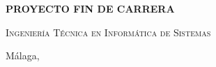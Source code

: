 \begin{titlepage}
  \bigskip
  
  \begin{center}\Large\textbf{\textsf{PROYECTO FIN DE CARRERA}}\end{center}
  
  \medskip
  
  \begin{center}
    \Huge
    \sffamily\scshape
    \pfctitlename   
  \end{center}
  
  \medskip
  
  \begin{center}
    \Huge
    \scshape%
    \textsf{Ingeniería Técnica en Informática de Sistemas}
  \end{center}
  
  \vfill
  
  {\large Málaga, \pfcanno \hfill \pfcauthorname}
\end{titlepage}
